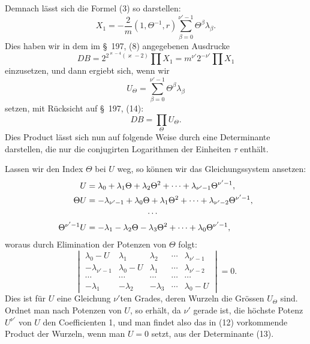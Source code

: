 \documentclass[11pt]{article}
\begin{document}
Demnach lässt sich die Formel (3) so darstellen:
\begin{equation}
X_1=-\frac2m(1,\Theta^{-1},r)\sum_{\beta=0}^{\nu'-1}\Theta^\beta\lambda_\beta.
\tag{10}
\end{equation}
Dies haben wir in dem im \S~197, (8) angegebenen Ausdrucke
\[
DB=2^{2^{\varkappa-4}(\varkappa-2)}\prod X_1=m^{\nu'}2^{-\nu'}\prod X_1
\]
einzusetzen, und dann ergiebt sich, wenn wir
\begin{equation}
U_\Theta=\sum_{\beta=0}^{\nu'-1}\Theta^\beta\lambda_\beta
\tag{11}
\end{equation}
setzen, mit Rücksicht auf \S~197, (14):
\begin{equation}
DB=\prod_\Theta U_\Theta.
\tag{12}
\end{equation}
Dies Product lässt sich nun auf folgende Weise durch eine Determinante darstellen, die nur die conjugirten Logarithmen der Einheiten $\tau$ enthält.

Lassen wir den Index $\Theta$ bei $U$ weg, so können wir das Gleichungssystem ansetzen:
\[
\begin{aligned}
U&=\lambda_0+\lambda_1\Theta+\lambda_2\Theta^2+\cdots+\lambda_{\nu'-1}\Theta^{\nu'-1},\\
\Theta U&=-\lambda_{\nu'-1}+\lambda_0\Theta+\lambda_1\Theta^2+\cdots+\lambda_{\nu'-2}\Theta^{\nu'-1},\\
&\hspace{2.5cm}\cdots\\
\Theta^{\nu'-1}U&=-\lambda_1-\lambda_2\Theta-\lambda_3\Theta^2+\cdots+\lambda_0\Theta^{\nu'-1},
\end{aligned}
\]
woraus durch Elimination der Potenzen von $\Theta$ folgt:
\begin{equation}
\begin{vmatrix}
\lambda_0-U&\lambda_1&\lambda_2&\cdots&\lambda_{\nu'-1}\\
-\lambda_{\nu'-1}&\lambda_0-U&\lambda_1&\cdots&\lambda_{\nu'-2}\\
\cdots&\cdots&\cdots&\cdots&\cdots\\
-\lambda_1&-\lambda_2&-\lambda_3&\cdots&\lambda_0-U
\end{vmatrix}=0.
\tag{13}
\end{equation}
Dies ist für $U$ eine Gleichung $\nu'$ten Grades, deren Wurzeln die Grössen $U_\Theta$ sind. Ordnet man nach Potenzen von $U$, so erhält, da $\nu'$ gerade ist, die höchste Potenz $U^{\nu'}$ von $U$ den Coefficienten 1, und man findet also das in (12) vorkommende Product der Wurzeln, wenn man $U=0$ setzt, aus der Determinante (13).
\end{document}
